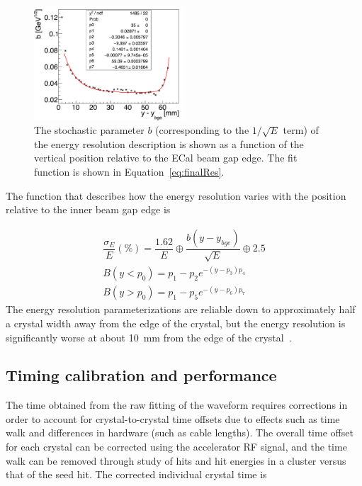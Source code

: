 \begin{figure}[htb]
  \centering
      \includegraphics[width=0.5\textwidth]{pics/performance/eResEdgeEffect.png}
  \caption[Characterization of the energy resolution edge effects ]{The stochastic parameter $b$ (corresponding to the $1/\sqrt{E}$ term) of the energy resolution description is shown as a function of the vertical position relative to the ECal beam gap edge. The fit function is shown in Equation~\eqref{eq:finalRes}.}
  \label{Figure:stochasticEdge}
\end{figure}
The function that describes how the energy resolution varies with the position relative to the inner beam gap edge is 

\begin{equation}
\begin{split}
\label{eq:finalRes}
\dfrac{\sigma_E}{E}(\%)=\dfrac{1.62}{E}\oplus \dfrac{b(y-y_{bge})}{\sqrt{E}} \oplus 2.5 \\
B(y<p_0) = p_1-p_2 e^{-(y-p_3)p_4}\\
B(y>p_0) = p_1-p_5 e^{-(y-p_6)p_7}
\end{split}
\end{equation}
The energy resolution parameterizations are reliable down to approximately half a crystal width away from the edge of the crystal, but the energy resolution is significantly worse at about 10~mm from the edge of the crystal~\cite{szumila-vance_hps_2016}.

\subsection{Timing calibration and performance}
The time obtained from the raw fitting of the waveform requires corrections in order to account for crystal-to-crystal time offsets due to effects such as time walk and differences in hardware (such as cable lengths). The overall time offset for each crystal can be corrected using the accelerator RF signal, and the time walk can be removed through study of hits and hit energies in a cluster versus that of the seed hit. The corrected individual crystal time is \\

